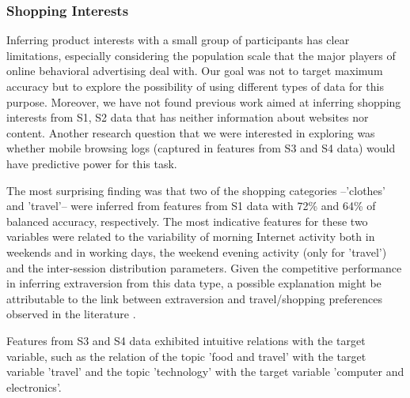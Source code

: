 \subsubsection{Shopping Interests}
Inferring product interests with a small group of participants has clear limitations, especially considering the population scale that the major players of online behavioral advertising deal with. Our goal was not to target maximum accuracy but to explore the possibility of using different types of data for this purpose. Moreover, we have not found previous work aimed at inferring shopping interests from S1, S2 data that has neither information about websites nor content. Another research question that we were interested in exploring was whether mobile browsing logs (captured in features from S3 and S4 data) would have predictive power for this task. 

The most surprising finding was that two of the shopping categories --'clothes' and 'travel'-- were inferred from features from S1 data with 72\% and 64\% of balanced accuracy, respectively. The most indicative features for these two variables were related to the variability of morning Internet activity both in weekends and in working days, the weekend evening activity (only for 'travel') and the inter-session distribution parameters. Given the competitive performance in inferring extraversion from this data type, a possible explanation might be attributable to the link between extraversion and travel/shopping preferences observed in the literature \cite{huang2010relationship}.

Features from S3 and S4 data exhibited intuitive relations with the target variable, such as the relation of the topic 'food and travel' with the target variable 'travel' and the topic 'technology' with the target variable 'computer and electronics'. 

